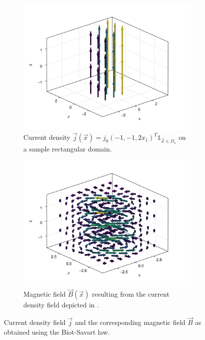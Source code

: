 \documentclass[10pt]{article}
\begin{document}
  \begin{figure}[H]
    \centering
    \begin{subfigure}[t]{0.48\textwidth}
      \centering
      \includegraphics[width=\textwidth]{../figures/homo-cdp-j-field.pdf}
      \caption{Current density $\vec{j}(\vec{x}) = {j}_0 (-1, -1, 2 x_1)^T \mathds{1}_{\vec{x} \in \Omega_s}$ on a sample rectangular domain.}
      \label{fig:demo-cdp-j-field}
    \end{subfigure}
    \hfill
    \begin{subfigure}[t]{0.48\textwidth}
      \centering
      \includegraphics[width=\textwidth]{../figures/homo-cdp-b-field.pdf}
      \caption{Magnetic field $\vec{B}(\vec{x})$ resulting from the current density field depicted in .}
      \label{fig:demo-cdp-b-field}
    \end{subfigure}
    \caption{Current density field $\vec{j}$ and the corresponding magnetic field $\vec{B}$ as obtained using the Biot-Savart law.}
  \end{figure}
\end{document}
